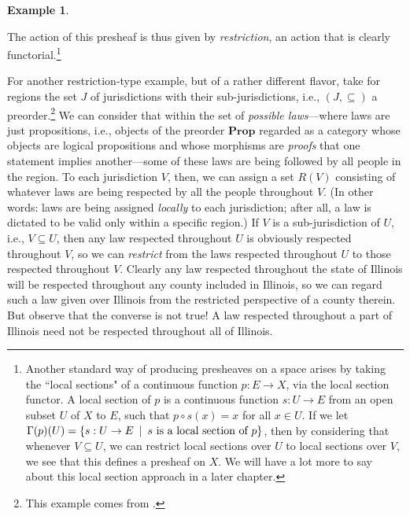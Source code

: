 \documentclass[11pt]{book}
\theoremstyle{definition}
\newtheorem{example}{Example}[section]
\theoremstyle{definition}
\theoremstyle{definition}
\theoremstyle{theorem}
\theoremstyle{definition}
\begin{document}
\begin{example}
\begin{center}
		\end{center} \vspace*{-1cm} 
		The action of this presheaf is thus given by \textit{restriction}, an action that is clearly functorial.\footnote{Another standard way of producing presheaves on a space arises by taking the ``local sections" of a continuous function $p: E \rightarrow X$, via the local section functor. A local section of $p$ is a continuous function $s: U \rightarrow E$ from an open subset $U$ of $X$ to $E$, such that $p \circ s (x) = x$ for all $x \in U$. If we let $\Gamma(p)(U) = \{s: U \rightarrow E \hspace*{0.5em} | \hspace*{0.5em} s \text{ is a local section of } p \}$, then by considering that whenever $V \subseteq  U$, we can restrict local sections over $U$ to local sections over $V$, we see that this defines a presheaf on $X$. We will have a lot more to say about this local section approach in a later chapter.}\par 
For another restriction-type example, but of a rather different flavor, take for regions the set $J$ of jurisdictions with their sub-jurisdictions, i.e., $(J, \subseteq )$ a preorder.\footnote{This example comes from \cite{spivak_category_2014}.} We can consider that within the set of \textit{possible laws}---where laws are just propositions, i.e., objects of the preorder $\textbf{Prop}$ regarded as a category whose objects are logical propositions and whose morphisms are \textit{proofs} that one statement implies another---some of these laws are being followed by all people in the region. To each jurisdiction $V$, then, we can assign a set $R(V)$ consisting of whatever laws are being respected by all the people throughout $V$. (In other words: laws are being assigned \textit{locally} to each jurisdiction; after all, a law is dictated to be valid only within a specific region.) If $V$ is a sub-jurisdiction of $U$, i.e., $V \subseteq  U$, then any law respected throughout $U$ is obviously respected throughout $V$, so we can \textit{restrict} from the laws respected throughout $U$ to those respected throughout $V$. Clearly any law respected throughout the state of Illinois will be respected throughout any county included in Illinois, so we can regard such a law given over Illinois from the restricted perspective of a county therein. But observe that the converse is not true! A law respected throughout a part of Illinois need not be respected throughout all of Illinois.\par 

\end{example}
\end{document}
